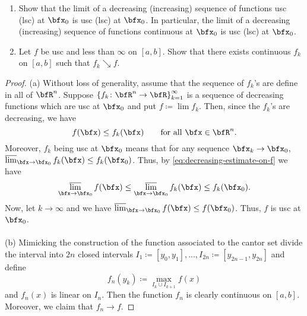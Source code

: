 \begin{problem}
\begin{enumerate}[label=(\alph*)]
\item Show that the limit of a decreasing (increasing) sequence of
  functions usc (lsc) at $\bfx_0$ is usc (lsc) at $\bfx_0$. In particular,
  the limit of a decreasing (increasing) sequence of functions continuous
  at $\bfx_0$ is usc (lsc) at $\bfx_0$.
\item Let $f$ be usc and less than $\infty$ on $[a,b]$. Show that there
  exists continuous $f_k$ on $[a,b]$ such that $f_k\searrow f$.
\end{enumerate}
\end{problem}
\begin{proof}
(a) Without loss of generality, assume that the sequence of $f_k$'s are
define in all of $\bfR^n$. Suppose
$\left\{f_k\colon\bfR^n\to\bfR\right\}_{k=1}^\infty$ is a sequence of
decreasing functions which are usc at $\bfx_0$ and put $f\coloneqq\lim
f_k$. Then, since the $f_k$'s are decreasing, we have
\begin{equation}
  \label{eq:decreasing-estimate-on-f}
f(\bfx)\leq f_k(\bfx)\qquad\text{for all $\bfx\in\bfR^n$.}
\end{equation}
Moreover, $f_k$ being usc at $\bfx_0$ means that for any sequence
$\bfx_k\to\bfx_0$, $\varlimsup_{\bfx\to\bfx_0} f_k(\bfx)\leq
f_k(\bfx_0)$. Thus, by \eqref{eq:decreasing-estimate-on-f} we have
\begin{equation}
  \label{eq:limit-estimate-on-f}
\varlimsup_{\bfx\to\bfx_0}f(\bfx)\leq\varlimsup_{\bfx\to\bfx_0}
f_k(\bfx)\leq f_k(\bfx_0).
\end{equation}
Now, let $k\to\infty$ and we have $\varlimsup_{\bfx\to\bfx_0} f(\bfx)\leq
f(\bfx_0)$. Thus, $f$ is usc at $\bfx_0$.
\\\\
(b) Mimicking the construction of the function associated to the cantor set
divide the interval into $2n$ closed intervals
$I_1\coloneqq[y_0,y_1],...,I_{2n}\coloneqq[y_{2n-1},y_{2n}]$ and define
\begin{equation}
  \label{eq:define-fn}
f_n(y_k)\coloneqq\max_{I_{k}\cup I_{k+1}} f(x)
\end{equation}
and $f_n(x)$ is linear on $I_n$. Then the function $f_n$ is clearly
continuous on $[a,b]$. Moreover, we claim that $f_n\to f$.
\end{proof}
\newpage

